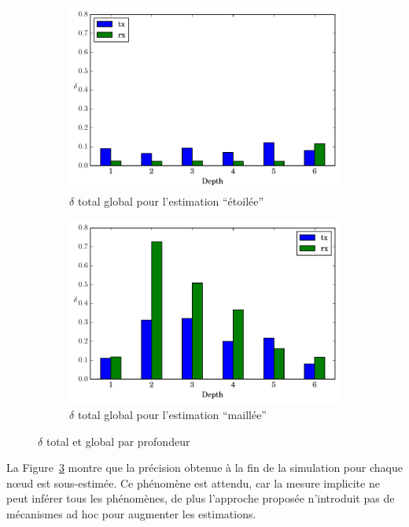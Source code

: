 \begin{figure}[ht]
  \begin{subfigure}{0.5\textwidth}
    \centering
    \includegraphics[width=\textwidth]{img/global_noinfo.pdf}
    \caption{$\delta$ total global pour l'estimation ``étoilée''}
    \label{supervision:fig:global_noinfo}
  \end{subfigure}
  \begin{subfigure}{0.5\textwidth}
    \centering
    \includegraphics[width=\textwidth]{img/global_route.pdf}
    \caption{$\delta$ total global pour l'estimation ``maillée''}
    \label{supervision:fig:global_route}
  \end{subfigure}
  \caption{$\delta$ total et global par profondeur}
  \label{supervision:fig:global}
\end{figure}

La Figure~\ref{supervision:fig:global} montre que la précision obtenue à la fin de la simulation pour chaque nœud est sous-estimée.
Ce phénomène est attendu, car la mesure implicite ne peut inférer tous les phénomènes, de plus l'approche proposée n'introduit pas de mécanismes ad hoc pour augmenter les estimations.

